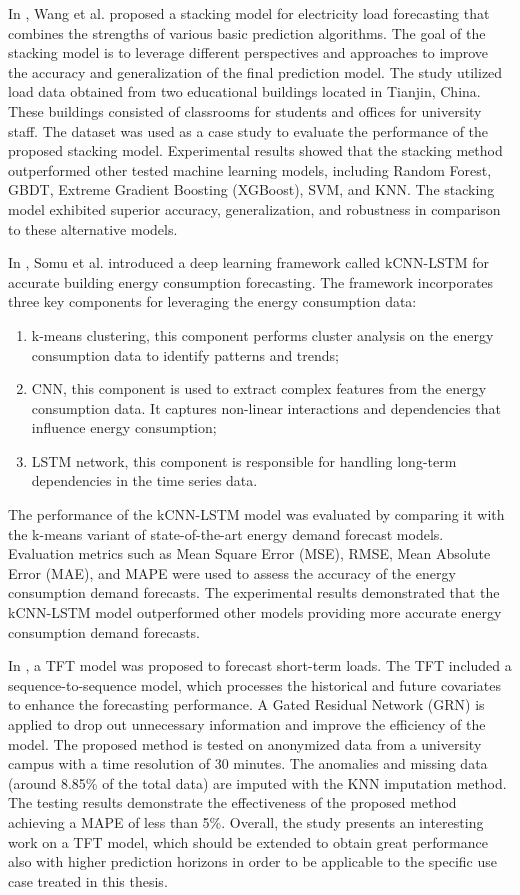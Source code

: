 In \cite{WANG2020114561}, Wang et al. proposed a stacking model for electricity load forecasting that combines the strengths of various basic prediction algorithms.
The goal of the stacking model is to leverage different perspectives and approaches to improve the accuracy and generalization of the final prediction model.
The study utilized load data obtained from two educational buildings located in Tianjin, China. These buildings consisted of classrooms for students and offices for university staff.
The dataset was used as a case study to evaluate the performance of the proposed stacking model.
Experimental results showed that the stacking method outperformed other tested machine learning models, including Random Forest, GBDT, Extreme Gradient Boosting (XGBoost), SVM, and KNN.
The stacking model exhibited superior accuracy, generalization, and robustness in comparison to these alternative models.

In \cite{SOMU2021110591}, Somu et al. introduced a deep learning framework called kCNN-LSTM for accurate building energy consumption forecasting.
The framework incorporates three key components for leveraging the energy consumption data:
\begin{enumerate}
  \item k-means clustering, this component performs cluster analysis on the energy consumption data to identify patterns and trends;
  \item CNN, this component is used to extract complex features from the energy consumption data. It captures non-linear interactions and dependencies that influence energy consumption;
  \item LSTM network, this component is responsible for handling long-term dependencies in the time series data.
\end{enumerate}
The performance of the kCNN-LSTM model was evaluated by comparing it with the k-means variant of state-of-the-art energy demand forecast models.
Evaluation metrics such as Mean Square Error (MSE), RMSE, Mean Absolute Error (MAE), and MAPE were used to assess the accuracy of the energy consumption demand forecasts.
The experimental results demonstrated that the kCNN-LSTM model outperformed other models providing more accurate energy consumption demand forecasts.

In \cite{10033079}, a TFT model was proposed to forecast short-term loads.
The TFT included a sequence-to-sequence model, which processes the historical and future covariates to enhance the forecasting performance.
A Gated Residual Network (GRN) is applied to drop out unnecessary information and improve the efficiency of the model.
The proposed method is tested on anonymized data from a university campus with a time resolution of 30 minutes.
The anomalies and missing data (around 8.85\% of the total data) are imputed with the KNN imputation method.
The testing results demonstrate the effectiveness of the proposed method achieving a MAPE of less than 5\%.
Overall, the study presents an interesting work on a TFT model, which should be extended to obtain great performance also with higher prediction horizons in order to be applicable to the specific use case treated in this thesis.

